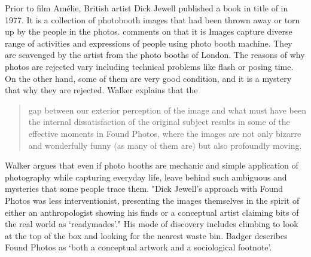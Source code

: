 
Prior to film Amélie, British artist Dick Jewell published a book in title of  in 1977. It is a collection of photobooth images that had been thrown away or torn up by the people in the photos. \cite{walker2010dick} comments on that it is  Images capture diverse range of activities and expressions of people using photo booth machine. They are scavenged by the artist from the photo booths of London. The reasons of why photos are rejected vary including technical problems like flash or posing time. On the other hand, some of them are very good condition, and it is a mystery that why they are rejected. Walker explains that the 

\begin{quote}
gap between our exterior perception of the image and what must have been the internal dissatisfaction of the original subject results in some of the effective moments in Found Photos, where the images are not only bizarre and wonderfully funny (as many of them are) but also profoundly moving.
\end{quote}

Walker argues that even if photo booths are mechanic and simple application of photography while capturing everyday life, leave behind such ambiguous and mysteries that some people trace them. "Dick Jewell’s approach with Found Photos was less interventionist, presenting the images themselves in the spirit of either an anthropologist showing his finds or a conceptual artist claiming bits of the real world as ‘readymades’." His mode of discovery includes climbing to look at the top of the box and looking for the nearest waste bin. Badger describes Found Photos as ‘both a conceptual artwork and a sociological footnote’.


